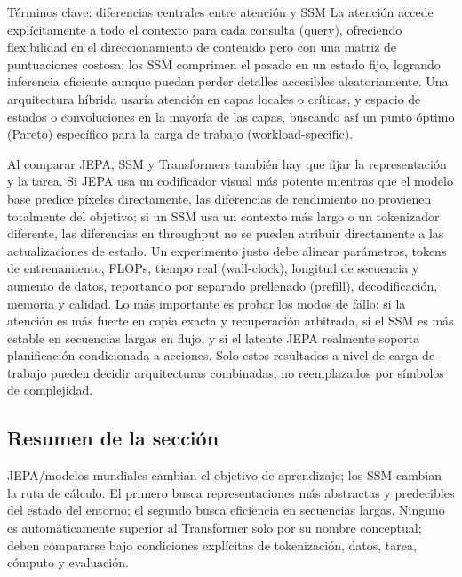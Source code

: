 
\begin{knowledgebox}{Términos clave: diferencias centrales entre atención y SSM}
La atención accede explícitamente a todo el contexto para cada consulta (query), ofreciendo flexibilidad en el direccionamiento de contenido pero con una matriz de puntuaciones costosa; los SSM comprimen el pasado en un estado fijo, logrando inferencia eficiente aunque puedan perder detalles accesibles aleatoriamente. Una arquitectura híbrida usaría atención en capas locales o críticas, y espacio de estados o convoluciones en la mayoría de las capas, buscando así un punto óptimo (Pareto) específico para la carga de trabajo (workload-specific).
\end{knowledgebox}

Al comparar JEPA, SSM y Transformers también hay que fijar la representación y la tarea. Si JEPA usa un codificador visual más potente mientras que el modelo base predice píxeles directamente, las diferencias de rendimiento no provienen totalmente del objetivo; si un SSM usa un contexto más largo o un tokenizador diferente, las diferencias en throughput no se pueden atribuir directamente a las actualizaciones de estado. Un experimento justo debe alinear parámetros, tokens de entrenamiento, FLOPs, tiempo real (wall-clock), longitud de secuencia y aumento de datos, reportando por separado prellenado (prefill), decodificación, memoria y calidad. Lo más importante es probar los modos de fallo: si la atención es más fuerte en copia exacta y recuperación arbitrada, si el SSM es más estable en secuencias largas en flujo, y si el latente JEPA realmente soporta planificación condicionada a acciones. Solo estos resultados a nivel de carga de trabajo pueden decidir arquitecturas combinadas, no reemplazados por símbolos de complejidad.

\subsection{Resumen de la sección}

JEPA/modelos mundiales cambian el objetivo de aprendizaje; los SSM cambian la ruta de cálculo. El primero busca representaciones más abstractas y predecibles del estado del entorno; el segundo busca eficiencia en secuencias largas. Ninguno es automáticamente superior al Transformer solo por su nombre conceptual; deben compararse bajo condiciones explícitas de tokenización, datos, tarea, cómputo y evaluación.


